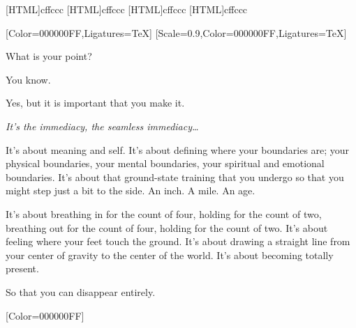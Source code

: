 [HTML]{cffccc}
[HTML]{cffccc}
[HTML]{cffccc}
[HTML]{cffccc}
\begin{paracol}{2}
  \begin{leftcolumn}
[Color=000000FF,Ligatures=TeX]
\renewfontfamily{}[Scale=0.9,Color=000000FF,Ligatures=TeX]

\begin{ally}
What is your point?
\end{ally}
You know.

\begin{ally}
Yes, but it is important that you make it.
\end{ally}
\emph{It's the immediacy, the seamless immediacy\ldots{}}

It's about meaning and self. It's about defining where your boundaries are; your physical boundaries, your mental boundaries, your spiritual and emotional boundaries. It's about that ground-state training that you undergo so that you might step just a bit to the side. An inch. A mile. An age.

It's about breathing in for the count of four, holding for the count of two, breathing out for the count of four, holding for the count of two. It's about feeling where your feet touch the ground. It's about drawing a straight line from your center of gravity to the center of the world. It's about becoming totally present.

\begin{ally}
So that you can disappear entirely.
\end{ally}
\newpage
\null
\newpage
\end{leftcolumn}
\end{paracol}


\renewfontfamily{}[Color=000000FF]

